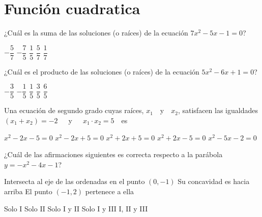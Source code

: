 \documentclass[sin nombre]{srs}
\begin{document}
\section{Función cuadratica}

\begin{preguntas}[after-item-skip=2cm]
\pregunta ¿Cuál es la suma de las soluciones (o raíces) de la ecuación $7x^2 - 5x - 1 = 0$?
\begin{vertical}
\alternativa $-\dfrac{5}{7}$
\alternativa $-\dfrac{7}{5}$
\alternativa $\dfrac{1}{5}$
\alternativa $\dfrac{5}{7}$
\alternativa $\dfrac{1}{7}$
\end{vertical}

\pregunta ¿Cuál es el producto de las soluciones (o raíces) de la ecuación $5x^2 - 6x + 1 = 0$?
\begin{vertical}
\alternativa $-\dfrac{3}{5}$
\alternativa $-\dfrac{1}{5}$
\alternativa $\dfrac{1}{5}$
\alternativa $\dfrac{3}{5}$
\alternativa $\dfrac{6}{5}$
\end{vertical}

\pregunta Una ecuación de segundo grado cuyas raíces, $x_1$~~y~~$x_2$, satisfacen las igualdades $\left(x_1 + x_2\right) = -2$~~~y~~~$x_1 \cdot x_2 = 5$~~es
\begin{vertical}
\alternativa $x^2 - 2x - 5 = 0$
\alternativa $x^2 - 2x + 5 = 0$
\alternativa $x^2 + 2x + 5 = 0$
\alternativa $x^2 + 2x - 5 = 0$
\alternativa $x^2 - 5x - 2 = 0$
\end{vertical}

\pregunta ¿Cuál de las afirmaciones siguientes es correcta respecto a la parábola $y = -x^2 - 4x - 1$?
\begin{verticali}
\alternativa Intersecta al eje de las ordenadas en el punto $\left(0, -1\right)$
\alternativa Su concavidad es hacia arriba
\alternativa El punto $\left(-1, 2\right)$ pertenece a ella
\end{verticali}
\begin{vertical}
\alternativa Solo I
\alternativa Solo II
\alternativa Solo I y II
\alternativa Solo I y III
\alternativa I, II y III
\end{vertical}


\end{preguntas}
\end{document}
